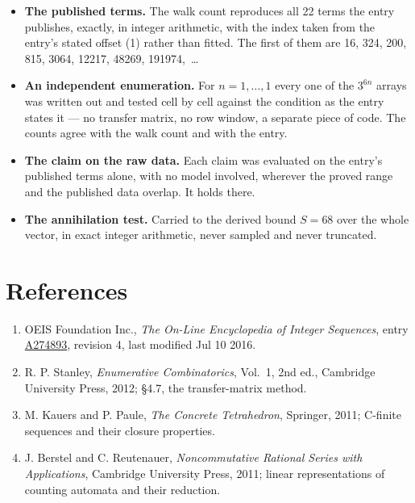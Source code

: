 \documentclass[11pt]{article}
\theoremstyle{definition}
\begin{document}
\begin{itemize}

\item {\bfseries The published terms.} The walk count reproduces all 22 terms the entry publishes, exactly, in integer arithmetic, with the index taken from the entry's stated offset (1) rather than fitted. The first of them are 16, 324, 200, 815, 3064, 12217, 48269, 191974,~\dots

\item {\bfseries An independent enumeration.} For $n = 1,\dots,1$ every one of the $3^{6n}$ arrays was written out and tested cell by cell against the condition as the entry states it --- no transfer matrix, no row window, a separate piece of code. The counts agree with the walk count and with the entry.

\item {\bfseries The claim on the raw data.} Each claim was evaluated on the entry's published terms alone, with no model involved, wherever the proved range and the published data overlap. It holds there.

\item {\bfseries The annihilation test.} Carried to the derived bound $S = 68$ over the whole vector, in exact integer arithmetic, never sampled and never truncated.

\end{itemize}

\section{References}

\begin{enumerate}

\item OEIS Foundation Inc., \emph{The On-Line Encyclopedia of Integer Sequences}, entry \href{https://oeis.org/A274893}{A274893}, revision 4, last modified Jul 10 2016.

\item R. P. Stanley, \emph{Enumerative Combinatorics}, Vol.~1, 2nd ed., Cambridge University Press, 2012; \S4.7, the transfer-matrix method.

\item M. Kauers and P. Paule, \emph{The Concrete Tetrahedron}, Springer, 2011; C-finite sequences and their closure properties.

\item J. Berstel and C. Reutenauer, \emph{Noncommutative Rational Series with Applications}, Cambridge University Press, 2011; linear representations of counting automata and their reduction.

\end{enumerate}
\end{document}
